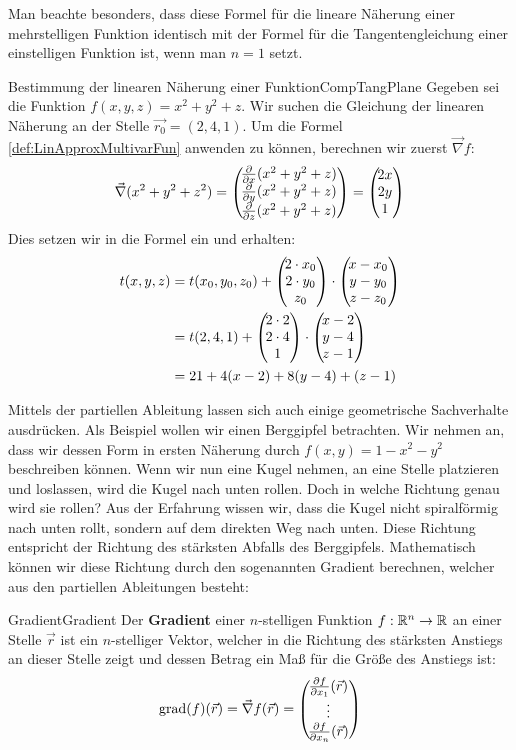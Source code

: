 Man beachte besonders, dass diese Formel für die lineare Näherung einer mehrstelligen Funktion identisch mit der Formel für die Tangentengleichung einer einstelligen Funktion ist, wenn man $n=1$ setzt.

\begin{example}{Bestimmung der linearen Näherung einer Funktion}{CompTangPlane}
    Gegeben sei die Funktion $f(x,y,z) =x^2+y^2+z$. Wir suchen die Gleichung der linearen Näherung an der Stelle $\vec{r_0} = (2,4,1)$. Um die Formel \ref{def:LinApproxMultivarFun} anwenden zu können, berechnen wir zuerst $\vec\nabla f$:
    $$
        \vec\nabla (x^2+y^2+z^2) = \left(\negthinspace\begin{matrix}\frac{\partial }{\partial x} (x^2+y^2+z)\\\frac{\partial }{\partial y} (x^2+y^2+z)\\\frac{\partial }{\partial z} (x^2+y^2+z)\end{matrix}\right) = \left(\negthinspace\begin{matrix}2x\\2y\\1\end{matrix}\right)
    $$
    Dies setzen wir in die Formel ein und erhalten:
    \begin{alignat*}{1}
        t(x,y,z) &= t(x_0,y_0,z_0) + \left(\negthinspace\begin{matrix}2\cdot x_0\\2\cdot y_0\\z_0\end{matrix}\right) \cdot \left(\negthinspace\begin{matrix}x-x_0\\y-y_0\\z-z_0\end{matrix}\right) \\
                 &= t(2,4,1) + \left(\negthinspace\begin{matrix}2\cdot 2\\2\cdot 4\\1\end{matrix}\right) \cdot \left(\negthinspace\begin{matrix}x-2\\y-4\\z-1\end{matrix}\right) \\
                 &= 21 + 4 (x-2) + 8 (y-4) + (z-1)
    \end{alignat*}
\end{example}

Mittels der partiellen Ableitung lassen sich auch einige geometrische Sachverhalte ausdrücken. Als Beispiel wollen wir einen Berggipfel betrachten. Wir nehmen an, dass wir dessen Form in ersten Näherung durch $f(x,y)=1-x^2-y^2$ beschreiben können. Wenn wir nun eine Kugel nehmen, an eine Stelle platzieren und loslassen, wird die Kugel nach unten rollen. Doch in welche Richtung genau wird sie rollen? Aus der Erfahrung wissen wir, dass die Kugel nicht spiralförmig nach unten rollt, sondern auf dem direkten Weg nach unten. Diese Richtung entspricht der Richtung des stärksten Abfalls des Berggipfels. Mathematisch können wir diese Richtung durch den sogenannten Gradient berechnen, welcher aus den partiellen Ableitungen besteht:

\begin{definition}{Gradient}{Gradient}
	Der \textbf{Gradient} einer $n$-stelligen Funktion $f: \mathbb{R}^n \to  \mathbb{R}$ an einer Stelle $\vec{r}$ ist ein $n$-stelliger Vektor, welcher in die Richtung des stärksten Anstiegs an dieser Stelle zeigt und dessen Betrag ein Maß für die Größe des Anstiegs ist:
	$$
		\text{grad}(f)(\vec{r}) = \vec\nabla f(\vec{r}) = \left(\negthinspace\begin{matrix}\frac{\partial f}{\partial x_1}(\vec{r})\\\vdots\\\frac{\partial f}{\partial x_n}(\vec{r})\end{matrix}\right)
	$$
\end{definition}

